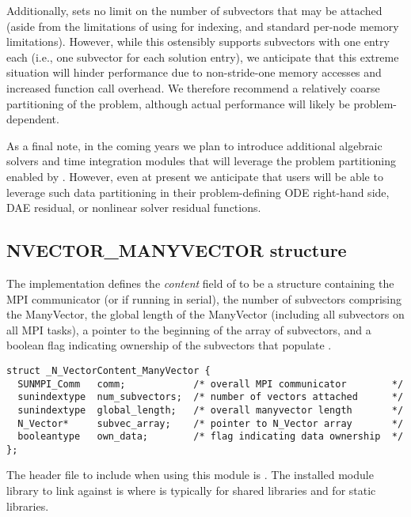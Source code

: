 Additionally, {\nvecmanyvector} sets no limit on the number of
subvectors that may be attached (aside from the limitations of using
 for indexing, and standard per-node memory
limitations).  However, while this ostensibly supports subvectors
with one entry each (i.e., one subvector for each solution entry), we
anticipate that this extreme situation will hinder performance due to
non-stride-one memory accesses and increased function call overhead.
We therefore recommend a relatively coarse partitioning of the
problem, although actual performance will likely be
problem-dependent.

As a final note, in the coming years we plan to introduce additional
algebraic solvers and time integration modules that will leverage the
problem partitioning enabled by {\nvecmanyvector}.  However, even at
present we anticipate that users will be able to leverage such data
partitioning in their problem-defining ODE right-hand side, DAE
residual, or nonlinear solver residual functions.


\subsection{NVECTOR\_MANYVECTOR structure}
\label{ss:nvec_manyvector_functions}

The {\nvecmanyvector} implementation defines the {\em content} field
of  to be a structure containing the MPI communicator
(or  if running in serial), the number of
subvectors comprising the ManyVector, the global length of the
ManyVector (including all subvectors on all MPI tasks), a pointer to
the beginning of the array of subvectors, and a boolean flag
 indicating ownership of the subvectors that populate
.
\begin{verbatim} 
struct _N_VectorContent_ManyVector {
  SUNMPI_Comm   comm;            /* overall MPI communicator        */
  sunindextype  num_subvectors;  /* number of vectors attached      */
  sunindextype  global_length;   /* overall manyvector length       */
  N_Vector*     subvec_array;    /* pointer to N_Vector array       */
  booleantype   own_data;        /* flag indicating data ownership  */
};
\end{verbatim}

The header file to include when using this module is
. The installed module library to link against is
 where  is typically
 for shared libraries and  for static libraries.


